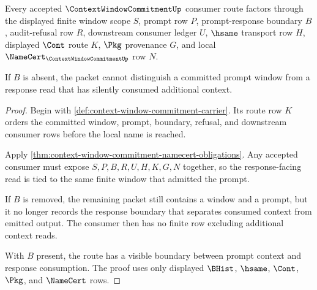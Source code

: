 \begin{theorem}
\label{thm:context-window-commitment-prompt-response-boundary}
Every accepted $\ContextWindowCommitmentUp$ consumer route factors through the displayed finite window scope $S$, prompt row $P$, prompt-response boundary $B$, audit-refusal row $R$, downstream consumer ledger $U$, $\hsame$ transport row $H$, displayed $\Cont$ route $K$, $\Pkg$ provenance $G$, and local $\NameCert_{\ContextWindowCommitmentUp}$ row $N$.

If $B$ is absent, the packet cannot distinguish a committed prompt window from a response read that has silently consumed additional context.
\end{theorem}
\begin{proof}
Begin with \autoref{def:context-window-commitment-carrier}. Its route row $K$ orders the committed window, prompt, boundary, refusal, and downstream consumer rows before the local name is reached.

Apply \autoref{thm:context-window-commitment-namecert-obligations}. Any accepted consumer must expose $S,P,B,R,U,H,K,G,N$ together, so the response-facing read is tied to the same finite window that admitted the prompt.

If $B$ is removed, the remaining packet still contains a window and a prompt, but it no longer records the response boundary that separates consumed context from emitted output. The consumer then has no finite row excluding additional context reads.

With $B$ present, the route has a visible boundary between prompt context and response consumption. The proof uses only displayed $\BHist$, $\hsame$, $\Cont$, $\Pkg$, and $\NameCert$ rows.
\end{proof}

